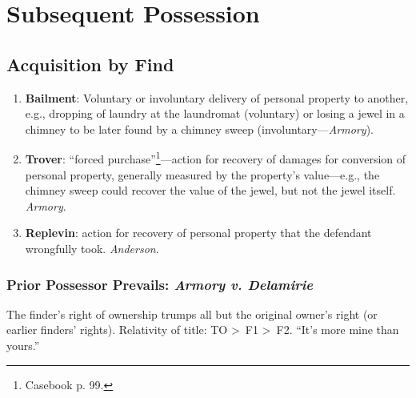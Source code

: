 \section{Subsequent Possession}

\subsection{Acquisition by Find}

\begin{enumerate}
    \item \textbf{Bailment}: Voluntary or involuntary delivery of personal 
    property to another, e.g., dropping of laundry at the laundromat 
    (voluntary) or losing a jewel in a chimney to be later found by a chimney 
    sweep (involuntary---\emph{Armory}).
    \item \textbf{Trover}: ``forced purchase''\footnote{Casebook p. 
    99.}---action for recovery of damages for conversion of personal property, 
    generally measured by the property's value---e.g., the chimney sweep could 
    recover the value of the jewel, but not the jewel itself. \emph{Armory}.
    \item \textbf{Replevin}: action for recovery of personal property that the  
    defendant wrongfully took. \emph{Anderson}.
\end{enumerate}

\subsubsection{Prior Possessor Prevails: \emph{Armory v. Delamirie}}

The finder's right of ownership trumps all but the original owner's right (or 
earlier finders' rights). Relativity of title: TO \textgreater\ F1 
\textgreater\ F2. ``It's more mine than yours.''

